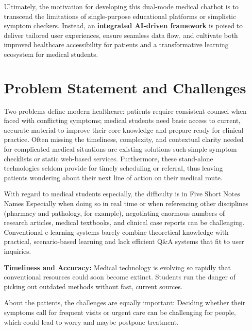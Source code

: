 \noindent Ultimately, the motivation for developing this dual-mode medical chatbot is to transcend the limitations of single-purpose educational platforms or simplistic symptom checkers. Instead, an \textbf{integrated AI-driven framework} is poised to deliver tailored user experiences, ensure seamless data flow, and cultivate both improved healthcare accessibility for patients and a transformative learning ecosystem for medical students.

\vspace{2cm}
\section{Problem Statement and Challenges}
\label{sec:problem-statement}

Two problems define modern healthcare: patients require consistent counsel when faced with conflicting symptoms; medical students need basic access to current, accurate material to improve their core knowledge and prepare ready for clinical practice. Often missing the timeliness, complexity, and contextual clarity needed for complicated medical situations are existing solutions such simple symptom checklists or static web-based services. Furthermore, these stand-alone technologies seldom provide for timely scheduling or referral, thus leaving patients wondering about their next line of action on their medical route.

With regard to medical students especially, the difficulty is in Five Short Notes Names Especially when doing so in real time or when referencing other disciplines (pharmacy and pathology, for example), negotiating enormous numbers of research articles, medical textbooks, and clinical case reports can be challenging. Conventional e-learning systems barely combine theoretical knowledge with practical, scenario-based learning and lack efficient Q\&A systems that fit to user inquiries.

\noindent \textbf{Timeliness and Accuracy:} Medical technology is evolving so rapidly that conventional resources could soon become extinct. Students run the danger of picking out outdated methods without fast, current sources.

About the patients, the challenges are equally important: Deciding whether their symptoms call for frequent visits or urgent care can be challenging for people, which could lead to worry and maybe postpone treatment.

